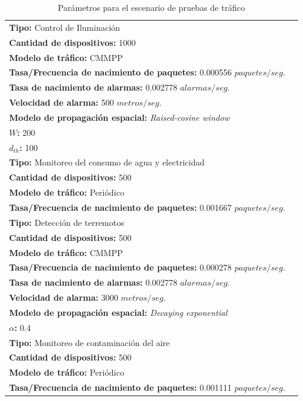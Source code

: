 \begin{table}
    \caption{Parámetros para el escenario de pruebas de tráfico}
    \label{tab:paramPruebaTrafico}
    \centering
    \begin{tabular}{|m{16cm}|p{20cm}|} \\ 
        \textbf{Tipo:} Control de Iluminación\\ \textbf{Cantidad de dispositivos:} 1000 \\ \textbf{Modelo de tráfico:} CMMPP \\ \textbf{Tasa/Frecuencia de nacimiento de paquetes:} 0.000556  $paquetes/seg$. \\ \textbf{Tasa de nacimiento de alarmas:} 0.002778 $alarmas/seg$. \\ \textbf{Velocidad de alarma:} 500 $metros/seg$. \\ \textbf{Modelo de propagación espacial:} \textit{Raised-cosine window} \\ \textbf{$W$:} 200 \\ \textbf{$d_{th}$:} 100 \\ \hline
        \textbf{Tipo:} Monitoreo del consumo de agua y electricidad \\ \textbf{Cantidad de dispositivos:} 500 \\ \textbf{Modelo de tráfico:} Periódico \\ \textbf{Tasa/Frecuencia de nacimiento de paquetes:} 0.001667  $paquetes/seg$. \\ \hline
        \textbf{Tipo:} Detección de terremotos\\ \textbf{Cantidad de dispositivos:} 500 \\ \textbf{Modelo de tráfico:} CMMPP \\ \textbf{Tasa/Frecuencia de nacimiento de paquetes:} 0.000278  $paquetes/seg$. \\ \textbf{Tasa de nacimiento de alarmas:} 0.002778 $alarmas/seg$. \\ \textbf{Velocidad de alarma:} 3000 $metros/seg$. \\ \textbf{Modelo de propagación espacial:} \textit{Decaying exponential} \\ \textbf{$\alpha$:} 0.4 \\ \hline
        \textbf{Tipo:} Monitoreo de contaminación del aire\\ \textbf{Cantidad de dispositivos:} 500 \\ \textbf{Modelo de tráfico:} Periódico \\ \textbf{Tasa/Frecuencia de nacimiento de paquetes:} 0.001111  $paquetes/seg$. \\ \hline

\end{tabular}
\end{table}
